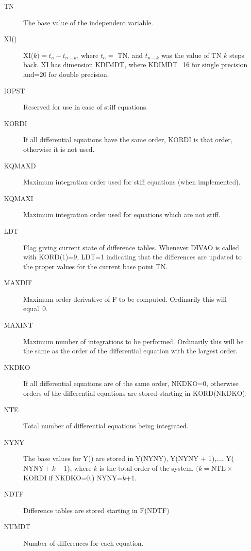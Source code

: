 \documentclass[twoside]{MATH77}
\begin{document}
\begin{description}
\item[TN]  The base value of the independent variable.

\item[XI()]  XI($k)=t_n-t_{n-k}$, where $t_n=$ {TN}, and $t_{n-k}$ was the
value of TN $k$ steps back. XI has dimension KDIMDT, where KDIMDT=16 for
single precision and=20 for double precision.

\item[IOPST]  Reserved for use in case of stiff equations.

\item[KORDI]  If all differential equations have the same order, KORDI is
that order, otherwise it is not used.

\item[KQMAXD]  Maximum integration order used for stiff equations (when
implemented).

\item[KQMAXI]  Maximum integration order used for equations which are not
stiff.

\item[LDT]  Flag giving current state of difference tables. Whenever DIVAO
is called with KORD(1)=9, LDT=1 indicating that the differences are updated
to the proper values for the current base point TN.

\item[MAXDIF]  Maximum order derivative of F to be computed. Ordinarily this
will equal~0.

\item[MAXINT]  Maximum number of integrations to be performed. Ordinarily
this will be the same as the order of the differential equation with the
largest order.

\item[NKDKO]  If all differential equations are of the same order, NKDKO=0,
otherwise orders of the differential equations are stored starting in
KORD(NKDKO).

\item[NTE]  Total number of differential equations being integrated.

\item[NYNY]  The base values for Y() are stored in Y(NYNY), Y(NYNY + 1),...,{%
Y}($\text{NYNY} + k - 1$), where $k$ is the total order of the system. $(k =
\text{NTE} \times $ KORDI if NKDKO=0.) NYNY=$k$+1.

\item[NDTF]  Difference tables are stored starting in F(NDTF)

\item[NUMDT]  Number of differences for each equation.
\end{description}
\end{document}
